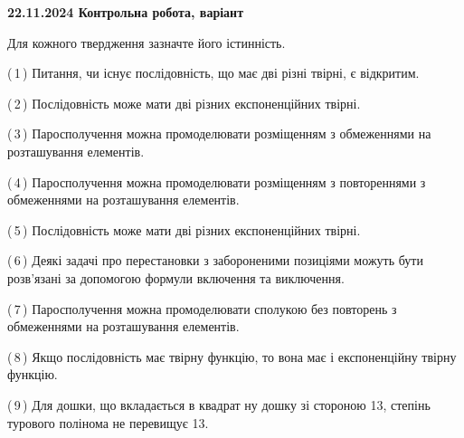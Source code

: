 \documentclass[12pt, ukrainian]{article}
\begin{document}
\begin {large}
\begin {large}
\begin {large}
\begin {large}
\begin {large}
\begin {large}
\begin {large}
\begin {large}
\begin {large}
\begin {large}
\begin {large}
\begin {large}
\begin {large}
\begin {large}
\begin {large}
\begin {large}
\begin {large}
\begin {large}
\begin {large}
\begin {large}
\begin {large}
\begin {large}
\begin {large}
\begin {large}
\begin {large}
\begin {large}
\begin {large}
\begin {large}
\begin {large}
\begin {large}
\begin {large}
\begin {large}
\begin {large}
\begin {large}
\begin {large}
\begin {large}
\begin {large}
\begin {large}
\begin {large}
\begin {large}
\begin {large}
\begin {large}
\begin {large}
\begin {large}
\begin {large}
\begin {large}
\textbf{22.11.2024 Контрольна робота, варіант  }\par


{
Для кожного твердження зазначте його істинність.\par

\vspace{2mm}

(\,1\,) Питання, чи існує послідовність, що має дві різні твірні, є відкритим.%



(\,2\,) Послідовність може мати дві різних експоненційних твірні.%



(\,3\,) Паросполучення можна промоделювати розміщенням з обмеженнями на розташування елементів.%



(\,4\,) Паросполучення можна промоделювати розміщенням з повтореннями з обмеженнями на розташування елементів.%



(\,5\,) Послідовність може мати дві різних експоненційних твірні.%



(\,6\,) Деякі задачі про перестановки з забороненими позиціями можуть бути розв’я\-за\-ні за допомогою формули включення та виключення.%



(\,7\,) Паросполучення можна промоделювати сполукою без повторень з обмеженнями на розташування елементів.%



(\,8\,) Якщо послідовність має твірну функцію, то вона має і експоненційну твірну функцію.%



(\,9\,) Для дошки, що вкладається в квадрат ну дошку зі стороною 13, степінь турового полінома не перевищує 13.%



}
\end{large}
\end{large}
\end{large}
\end{large}
\end{large}
\end{large}
\end{large}
\end{large}
\end{large}
\end{large}
\end{large}
\end{large}
\end{large}
\end{large}
\end{large}
\end{large}
\end{large}
\end{large}
\end{large}
\end{large}
\end{large}
\end{large}
\end{large}
\end{large}
\end{large}
\end{large}
\end{large}
\end{large}
\end{large}
\end{large}
\end{large}
\end{large}
\end{large}
\end{large}
\end{large}
\end{large}
\end{large}
\end{large}
\end{large}
\end{large}
\end{large}
\end{large}
\end{large}
\end{large}
\end{large}
\end{large}
\end{document}
